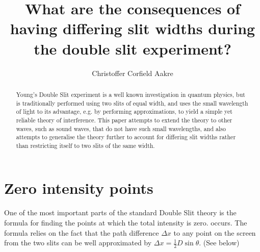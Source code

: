 \documentclass{paper}
\title{What are the consequences of having differing slit widths during the double slit experiment?}
\author{Christoffer Corfield Aakre}
\begin{document}
 
\maketitle
\begin{abstract}
    Young's Double Slit experiment is a well known investigation
    in quantum physics, but is traditionally performed using two
    slits of equal width, and uses the small wavelength of light
    to its advantage, e.g. by performing approximations, to yield
    a simple yet reliable theory of interference. This paper 
    attempts to extend the theory to other waves, such as sound waves,
    that do not have such small wavelengths, and also attempts to 
    generalise the theory further to account for differing slit widths
    rather than restricting itself to two slits of the same width.
\end{abstract}
\pagebreak
\tableofcontents
\pagebreak
\section{Zero intensity points}
\label{section:zero-intensity}

One of the most important parts of the standard Double Slit theory is
the formula for finding the points at which the total intensity is zero.
occurs. The formula relies on the fact that the path difference $\Delta{x}$ to any point on
the screen from the two slits can be well approximated by $\Delta{x} = \frac{1}{2}D\sin{\theta}$. (See  below)
\end{document}
